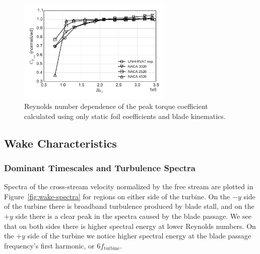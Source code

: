 \documentclass[energies,article,accept,moreauthors,pdftex,12pt,a4paper]{mdpi}
\begin{document}
\begin{figure}[ht]
\centering
\includegraphics[width=0.65\textwidth]{figures/cft_re_dep_foils}
\caption{Reynolds number dependence of the peak torque coefficient calculated using 
only static foil coefficients and blade kinematics.}
\label{fig:foils-C_T-Re-dep}
\end{figure}


\subsection{Wake Characteristics}






\subsubsection{Dominant Timescales and Turbulence Spectra}

Spectra of the cross-stream velocity normalized by the free stream are plotted
in Figure~\ref{fig:wake-spectra} for regions on either side of the turbine. On
the $-y$ side of the turbine there is broadband turbulence produced by blade
stall, and on the $+y$ side there is a clear peak in the spectra caused by the
blade passage. We see that on both sides there is higher spectral energy at
lower Reynolds numbers. On the $+y$ side of the turbine we notice higher
spectral energy at the blade passage frequency's first harmonic, or $6
f_\mathrm{turbine}$.


\end{document}
